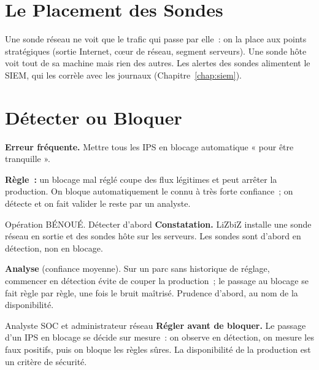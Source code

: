 \section{Le Placement des Sondes}
\label{sec:c06-placement}

Une sonde réseau ne voit que le trafic qui passe par elle~: on la place aux
points stratégiques (sortie Internet, cœur de réseau, segment serveurs). Une
sonde hôte voit tout de sa machine mais rien des autres. Les alertes des
sondes alimentent le SIEM, qui les corrèle avec les journaux
(Chapitre~\ref{chap:siem}).

\section{Détecter ou Bloquer}
\label{sec:c06-arbitrage}

\begin{boxalert}
\textbf{Erreur fréquente.} Mettre tous les IPS en blocage automatique « pour
être tranquille ».

\smallskip
\textbf{Règle~:} un blocage mal réglé coupe des flux légitimes et peut arrêter
la production. On bloque automatiquement le connu à très forte confiance~; on
détecte et on fait valider le reste par un analyste.
\end{boxalert}

\begin{boxscenario}{Opération BÉNOUÉ. Détecter d'abord}
\textbf{Constatation.} LiZbiZ installe une sonde réseau en sortie et des
sondes hôte sur les serveurs. Les sondes sont d'abord en détection, non en
blocage.

\medskip
\textbf{Analyse} (confiance moyenne). Sur un parc sans historique de réglage,
commencer en détection évite de couper la production~; le passage au blocage
se fait règle par règle, une fois le bruit maîtrisé. Prudence d'abord, au nom
de la disponibilité.
\end{boxscenario}

\begin{boxmetier}{Analyste SOC et administrateur réseau}
\textbf{Régler avant de bloquer.} Le passage d'un IPS en blocage se décide
sur mesure~: on observe en détection, on mesure les faux positifs, puis on
bloque les règles sûres. La disponibilité de la production est un critère de
sécurité.
\end{boxmetier}

